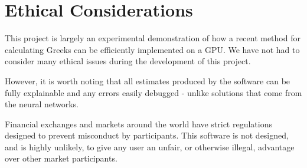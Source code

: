 \chapter{Ethical Considerations}
This project is largely an experimental demonstration of how a recent method for calculating Greeks can be efficiently implemented on a GPU. We have not had to consider many ethical issues during the development of this project.

However, it is worth noting that all estimates produced by the software can be fully explainable and any errors easily debugged - unlike solutions that come from the neural networks.

Financial exchanges and markets around the world have strict regulations designed to prevent misconduct by participants. This software is not designed, and is highly unlikely, to give any user an unfair, or otherwise illegal, advantage over other market participants.